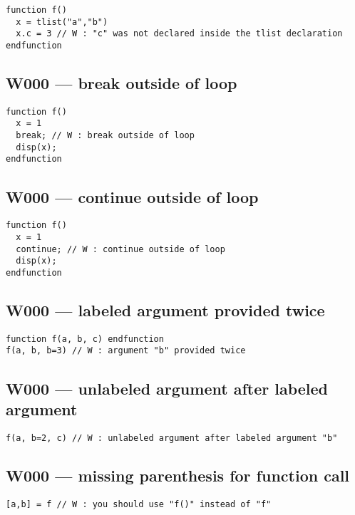 \begin{verbatim}
function f()
  x = tlist("a","b")
  x.c = 3 // W : "c" was not declared inside the tlist declaration
endfunction
\end{verbatim}


\subsection{W000 --- break outside of loop}


\begin{verbatim}
function f()
  x = 1
  break; // W : break outside of loop
  disp(x);
endfunction
\end{verbatim}


\subsection{W000 --- continue outside of loop}


\begin{verbatim}
function f()
  x = 1
  continue; // W : continue outside of loop
  disp(x);
endfunction
\end{verbatim}


\subsection{W000 --- labeled argument provided twice}


\begin{verbatim}
function f(a, b, c) endfunction
f(a, b, b=3) // W : argument "b" provided twice
\end{verbatim}


\subsection{W000 --- unlabeled argument after labeled argument}


\begin{verbatim}
f(a, b=2, c) // W : unlabeled argument after labeled argument "b"
\end{verbatim}


\subsection{W000 --- missing parenthesis for function call}


\begin{verbatim}
[a,b] = f // W : you should use "f()" instead of "f"
\end{verbatim}


